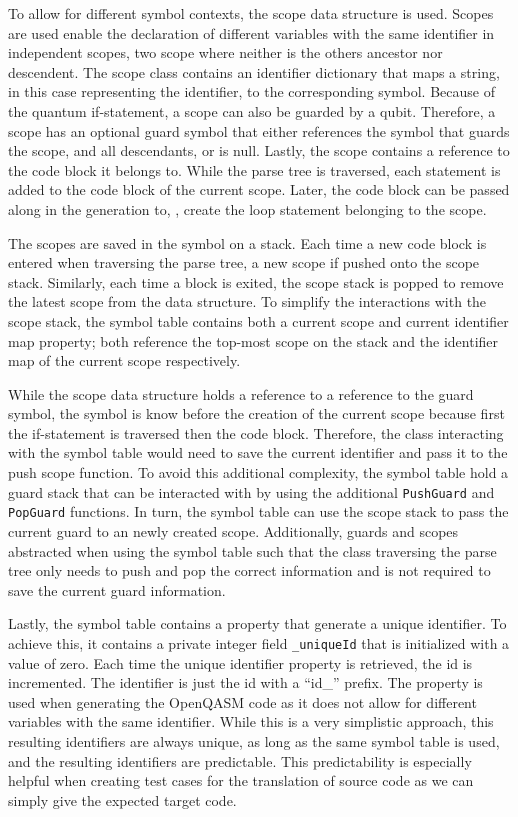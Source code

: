 To allow for different symbol contexts, the scope data structure is used. Scopes are used enable the declaration of different variables with the same identifier in independent scopes, \ie two scope where neither is the others ancestor nor descendent. The scope class contains an identifier dictionary that maps a string, in this case representing the identifier, to the corresponding symbol. Because of the quantum if-statement, a scope can also be guarded by a qubit. Therefore, a scope has an optional guard symbol that either references the symbol that guards the scope, and all descendants, or is null. Lastly, the scope contains a reference to the code block it belongs to. While the parse tree is traversed, each statement is added to the code block of the current scope. Later, the code block can be passed along in the generation to, \eg, create the loop statement belonging to the scope. 

The scopes are saved in the symbol on a stack. Each time a new code block is entered when traversing the parse tree, a new scope if pushed onto the scope stack. Similarly, each time a block is exited, the scope stack is popped to remove the latest scope from the data structure. To simplify the interactions with the scope stack, the symbol table contains both a current scope and current identifier map property; both reference the top-most scope on the stack and the identifier map of the current scope respectively.

While the scope data structure holds a reference to a reference to the guard symbol, the symbol is know before the creation of the current scope because first the if-statement is traversed then the code block. Therefore, the class interacting with the symbol table would need to save the current identifier and pass it to the push scope function. To avoid this additional complexity, the symbol table hold a guard stack that can be interacted with by using the additional \texttt{PushGuard} and \texttt{PopGuard} functions. In turn, the symbol table can use the scope stack to pass the current guard to an newly created scope. Additionally, guards and scopes abstracted when using the symbol table such that the class traversing the parse tree only needs to push and pop the correct information and is not required to save the current guard information. 

Lastly, the symbol table contains a property that generate a unique identifier. To achieve this, it contains a private integer field \texttt{\_uniqueId} that is initialized with a value of zero. Each time the unique identifier property is retrieved, the id is incremented. The identifier is just the id with a ``id\_'' prefix. The property is used when generating the OpenQASM code as it does not allow for different variables with the same identifier. While this is a very simplistic approach, this resulting identifiers are always unique, as long as the same symbol table is used, and the resulting identifiers are predictable. This predictability is especially helpful when creating test cases for the translation of source code as we can simply give the expected target code. 